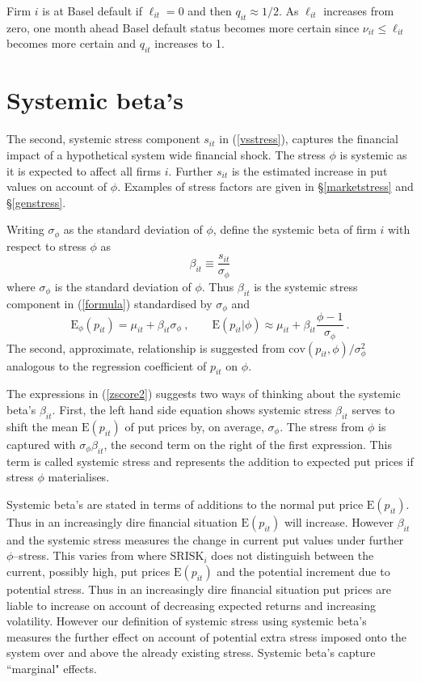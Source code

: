 \documentclass[authoryear]{elsarticle}
\newcommand{\E}{\mathrm{E}}
\newcommand{\cov}{\mathrm{cov}}
\newcommand{\Es}{\E_\phi}
\newcommand{\eref}[1]{(\ref{#1})}
\newcommand{\sref}[1]{\S\ref{#1}}
\newcommand{\cq}{\ , \qquad}
\newcommand{\be}[1]{\begin{equation}\label{#1}}
\newcommand{\ee}{\end{equation}}
\begin{document}
Firm $i$ is at Basel default if $\ell_{it}=0$  and then  $q_{it}\approx 1/2$.   As  $\ell_{it}$ increases from zero,  one month ahead Basel default status  becomes more certain since $\nu_{it}\le \ell_{it}$ becomes more certain and $q_{it}$ increases to 1. 

   

  
   
\section{Systemic beta's}

The second, systemic stress component $s_{it}$ in  \eref{vsstress},  captures the financial impact of a  hypothetical system wide financial shock.   The stress $\phi$ is systemic as it is expected to affect all firms $i$.  Further $s_{it}$ is the estimated   increase in put values on account of  $\phi$.   Examples of stress factors are given in \sref{marketstress} and \sref{genstress}.
 

Writing  $\sigma_{\phi}$ as the standard deviation of $\phi$,  define the systemic beta of firm $i$ with respect to stress $\phi$ as
\be{zscore}
\beta_{it}\equiv \frac{s_{it}}{\sigma_\phi}
\ee
where  $\sigma_\phi$ is the standard deviation of $\phi$.   Thus $\beta_{it}$ is the systemic stress component in \eref{formula} standardised by $\sigma_\phi$ and
\be{zscore2}
\Es(p_{it})  = \mu_{it} + \beta_{it}\sigma_\phi\cq \E(p_{it}|\phi) \approx \mu_{it} + \beta_{it}\frac{\phi-1}{\sigma_\phi}\ .
\ee
The second, approximate, relationship is suggested from   $\cov(p_{it},\phi)/\sigma^2_\phi$ analogous to the regression coefficient of $p_{it}$ on $\phi$.

The expressions in \eref{zscore2} suggests two ways of  thinking about the  systemic beta's  $\beta_{it}$.   First, the left hand side equation shows systemic stress $\beta_{it}$ serves to shift the mean $\E(p_{it})$ of put prices  by, on average, $\sigma_\phi$.    The stress from $\phi$ is captured with $\sigma_\phi\beta_{it}$, the second term on the right of the first expression.   This term is called systemic stress and represents the addition to expected put prices if stress $\phi$ materialises.  

Systemic beta's are stated in terms of additions to the normal put price $\E(p_{it})$. Thus in an increasingly dire financial situation $\E(p_{it})$ will increase.   However  $\beta_{it}$ and the systemic stress measures the  change in current put values  under  further $\phi$--stress.  This varies from  \cite{brownlees2015} where $\mathrm{SRISK}_i$ does not distinguish between the current, possibly high, put prices $\E(p_{it})$ and the potential  increment due to potential stress.   Thus in an increasingly dire financial situation put prices are liable to increase on account of decreasing expected returns and increasing volatility.   However our definition of systemic stress using systemic beta's measures the further effect on account of potential extra stress imposed onto the system over and above the already existing stress.   Systemic beta's capture   ``marginal" effects.  
\end{document}
